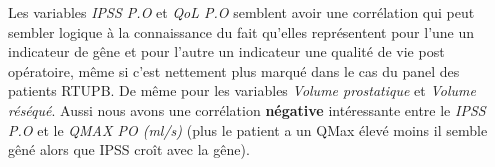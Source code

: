 Les variables  \emph{IPSS P.O} et   \emph{QoL P.O}  semblent avoir une corrélation qui peut sembler logique à la connaissance du fait qu’elles représentent pour l’une un indicateur de gêne et pour l’autre un indicateur une qualité de vie post opératoire, même si c’est nettement plus marqué dans le cas du panel des patients RTUPB. De même  pour les variables \emph{Volume prostatique} et \emph{Volume réséqué}. Aussi nous avons une corrélation \textbf{négative} intéressante entre le \emph{IPSS P.O} et le \emph{QMAX PO (ml/s)} (plus le patient a un QMax élevé moins il semble gêné alors que IPSS croît avec la gêne). 









%
